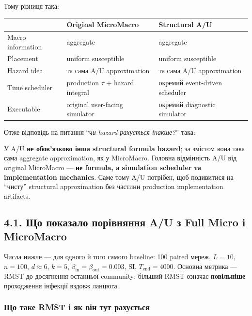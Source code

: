 \documentclass[11pt,a4paper]{article}
\begin{document}
Тому різниця така:

\begin{center}
\begin{tabular}{>{\raggedright\arraybackslash}p{42mm} >{\raggedright\arraybackslash}p{52mm} >{\raggedright\arraybackslash}p{52mm}}
\toprule
 & \textbf{Original MicroMacro} & \textbf{Structural A/U}\\
\midrule
Macro information & aggregate & aggregate\\
Placement & uniform susceptible & uniform susceptible\\
Hazard idea & та сама A/U approximation & та сама A/U approximation\\
Time scheduler & production $\tau$ + hazard integral & окремий event-driven scheduler\\
Executable & original user-facing simulator & окремий diagnostic simulator\\
\bottomrule
\end{tabular}
\end{center}

Отже відповідь на питання ``\textit{чи hazard рахується інакше?}'' така:

\begin{tcolorbox}[colback=soft,colframe=macro,title=Коротка відповідь]
У A/U \textbf{не обов'язково інша structural formula hazard}; за змістом вона така сама aggregate approximation, як у MicroMacro. Головна відмінність A/U від original MicroMacro --- \textbf{не formula, а simulation scheduler та implementation mechanics}. Саме тому A/U потрібен, щоб подивитися на ``чисту'' structural approximation без частини production implementation artifacts.
\end{tcolorbox}

\subsection*{4.1. Що показало порівняння A/U з Full Micro і MicroMacro}

Числа нижче --- для одного й того самого baseline: 100 paired мереж, $L=10$, $n=100$, $d\approx6$, $k=5$, $\beta_{\mathrm{in}}=\beta_{\mathrm{out}}=0.003$, SI, $T_{\mathrm{end}}=4000$. Основна метрика --- RMST до досягнення останньої community: більший RMST означає \textbf{повільніше} проходження інфекції вздовж ланцюга.

\subsubsection*{Що таке RMST і як він тут рахується}
\end{document}
